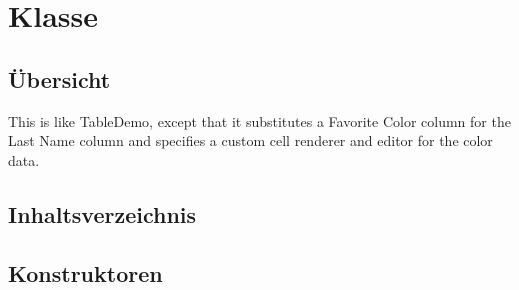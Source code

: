 
\section[ClassTableIndividual]{Klasse }\label{ontologyFramework.OFErrorManagement.OFGUI.individualGui.ClassTableIndividual-class}
\subsection{Übersicht}
This is like TableDemo, except that it substitutes a
 Favorite Color column for the Last Name column and specifies
 a custom cell renderer and editor for the color data.
\subsection{Inhaltsverzeichnis}
\subsection{Konstruktoren}
\begin{description}
\item[{\label{ontologyFramework.OFErrorManagement.OFGUI.individualGui.ClassTableIndividual(java.lang.String,java.lang.Integer,javax.swing.JTextArea,javax.swing.JFrame,java.lang.Integer)}}]
~ 
\end{description}
